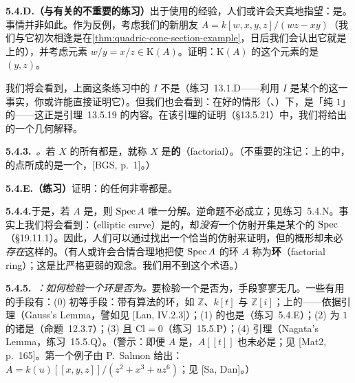 \textbf{5.4.D.（与\trIdealOfDenominators{}有关的不重要的练习）}\quad 出于使用\trUFD{}的经验，人们或许会天真地指望：\trIdealOfDenominators{}是\trPrincipalIdeal。事情并非如此。作为反例，考虑我们的新朋友 $A=k[w,x,y,z]/(wz-xy)$（我们与它初次相逢是在\cref{thm:quadric-cone-section-example}，日后我们会认出它就是\trQuadricSurface{}上的\trCone），并考虑元素 $w/y=x/z\in\mathrm{K}(A)$。证明：$\mathrm{K}(A)$ 的这个元素的\trIdealOfDenominators{}是 $(y,z)$。

我们将会看到，上面这条练习中的 $I$ 不是\trPrincipalIdeal（练习~13.1.D——利用 $I$ 是某个\trGradedRing{}的\trHomogeneous\trIdeal{}这一事实，你或许能直接证明它）。但我们也会看到：在好的情形（\trNoetherian、\trNormal）下，\trIdealOfDenominators{}是「纯\trCodimension{} $1$」的——这正是\trAlgebraic\trHartogs{}引理~13.5.19 的内容。在该引理的证明（\S13.5.21）中，我们将给出\trIdealOfDenominators{}的一个几何解释。

\textbf{5.4.3.}\ \emph{\trFactoriality{}。}\quad 若\trScheme{} $X$ 的所有\trStalk{}都是\trUFD，就称 $X$ 是\textbf{\trFactorial{}的}（factorial）。（不重要的注记：\trAlgClosedField{}上的\trAffine\trVariety{}中，\trFactorial{}的点所成的\trLocus{}是一个\trOpenSubset，[BGS, p.~1]。）

\textbf{5.4.E.（练习）}\quad 证明：\trUFD{}的任何非零\trLocalization{}都是\trUFD。

\textbf{5.4.4.}\quad 于是，若 $A$ 是\trUFD，则 $\operatorname{Spec} A$ 唯一分解。逆命题不必成立；见练习~5.4.N。事实上我们将会看到：\textbf{\trEllipticCurve{}}（elliptic curve）是\trFactorial{}的，却\emph{没有}一个仿射开集是某个\trUFD{}的 $\operatorname{Spec}$（\S19.11.1）。因此，人们可以通过找出一个恰当的仿射\trCover{}来证明\trFactoriality{}，但\trFactorial{}的概形却未必\emph{存在}这样的\trCover。（有人或许会合情合理地把使 $\operatorname{Spec} A$ \trFactorial{}的环 $A$ 称为\textbf{\trFactorial{}环}（factorial ring）；这是比\trUFD{}严格更弱的观念。我们用不到这个术语。）

\textbf{5.4.5.}\ \emph{\trhRemark{}：如何检验一个环是否为\trUFD。}\quad 要检验一个\trNoetherian{}\trIntegralDomain{}是否为\trUFD，手段寥寥无几。一些有用的手段有：(0) 初等手段：带有\trEuclid{}算法的环，如 $\mathbb{Z}$、$k[t]$ 与 $\mathbb{Z}[i]$；\trUFD{}上的\trPolynomialRing{}——依据\trGauss{}引理（Gauss's Lemma，譬如见 [Lan, IV.2.3]）；(1) \trUFD{}的\trLocalization{}也是\trUFD（练习~5.4.E）；(2) \trHeight{}为 $1$ 的诸\trPrimeIdeal{}是\trPrincipalIdeal（命题~12.3.7）；(3) \trNormal{}且 $\mathrm{Cl}=0$（练习~15.5.P）；(4) \trNagata{}引理（Nagata's Lemma，练习~15.5.Q）。（警示：即便 $A$ 是\trUFD，$A[[t]]$ 也未必是；见 [Mat2, p.~165]。第一个例子由 P.~Salmon 给出：$A=k(u)[[x,y,z]]/(z^2+x^3+uz^6)$；见 [Sa, Dan]。）

